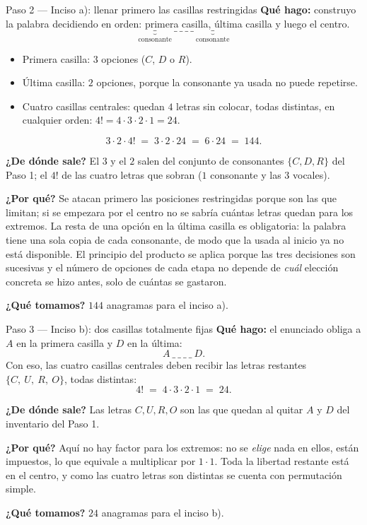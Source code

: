 \documentclass[11pt]{article}
\begin{document}
\begin{paso}{Paso 2 --- Inciso a): llenar primero las casillas restringidas}
\textbf{Qué hago:} construyo la palabra decidiendo en orden: primera casilla, última casilla y luego el
centro.
\[
\underbrace{\_}_{\text{consonante}}\ \_\ \_\ \_\ \_\ \underbrace{\_}_{\text{consonante}}
\]
\begin{itemize}[leftmargin=1.4em]
\item Primera casilla: $3$ opciones ($C$, $D$ o $R$).
\item Última casilla: $2$ opciones, porque la consonante ya usada no puede repetirse.
\item Cuatro casillas centrales: quedan $4$ letras sin colocar, todas distintas, en cualquier orden:
$4!=4\cdot3\cdot2\cdot1=24$.
\end{itemize}
\[
3\cdot 2\cdot 4! \;=\; 3\cdot 2\cdot 24 \;=\; 6\cdot 24 \;=\; 144.
\]

\textbf{¿De dónde sale?} El $3$ y el $2$ salen del conjunto de consonantes $\{C,D,R\}$ del Paso 1; el $4!$ de
las cuatro letras que sobran ($1$ consonante y las $3$ vocales).

\textbf{¿Por qué?} Se atacan primero las posiciones restringidas porque son las que limitan; si se empezara
por el centro no se sabría cuántas letras quedan para los extremos. La resta de una opción en la última
casilla es obligatoria: la palabra tiene una sola copia de cada consonante, de modo que la usada al inicio ya
no está disponible. El principio del producto se aplica porque las tres decisiones son sucesivas y el número
de opciones de cada etapa no depende de \emph{cuál} elección concreta se hizo antes, solo de cuántas se
gastaron.

\textbf{¿Qué tomamos?} $144$ anagramas para el inciso a).
\end{paso}

\begin{paso}{Paso 3 --- Inciso b): dos casillas totalmente fijas}
\textbf{Qué hago:} el enunciado obliga a $A$ en la primera casilla y $D$ en la última:
\[
A\ \_\ \_\ \_\ \_\ D .
\]
Con eso, las cuatro casillas centrales deben recibir las letras restantes $\{C,\ U,\ R,\ O\}$, todas
distintas:
\[
4! \;=\; 4\cdot3\cdot2\cdot1 \;=\; 24.
\]

\textbf{¿De dónde sale?} Las letras $C,U,R,O$ son las que quedan al quitar $A$ y $D$ del inventario del
Paso 1.

\textbf{¿Por qué?} Aquí no hay factor para los extremos: no se \emph{elige} nada en ellos, están impuestos,
lo que equivale a multiplicar por $1\cdot 1$. Toda la libertad restante está en el centro, y como las cuatro
letras son distintas se cuenta con permutación simple.

\textbf{¿Qué tomamos?} $24$ anagramas para el inciso b).
\end{paso}
\end{document}
